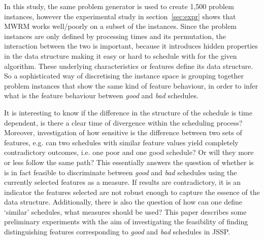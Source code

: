 \documentclass[10pt]{llncs} %
\newcommand{\good}{\emph{good} }
\newcommand{\bad}{\emph{bad} }
\begin{document}
In this study, the same problem generator is used to create 1,500 problem instances, however the experimental study in section~\ref{sec:expr} shows that MWRM works well/poorly on a subset of the instances. Since the problem instances are only defined by processing times and its permutation, the interaction between the two is important, because it introduces hidden properties in the data structure making it easy or hard to schedule with for the given algorithm. These underlying characteristics or features define its data structure. So a sophisticated way of discretising the instance space is grouping together problem instances that show the same kind of feature behaviour, in order to infer what is the feature behaviour between \good and \bad schedules. 

It is interesting to know if the difference in the structure of the schedule is time dependent, is there a clear time of divergence within the scheduling process? Moreover, investigation of how sensitive is the difference between two sets of features, e.g. can two schedules with similar feature values yield completely contradictory outcomes, i.e. one poor and one good schedule? Or will they more or less follow the same path? This essentially answers the question of whether is is in fact feasible to discriminate between \good and \bad schedules using the currently selected features as a measure. If results are contradictory, it is an indicator the features selected are not robust enough to capture the essence of the data structure. 
Additionally, there is also the question of how can one define `similar' schedules, what measures should be used? This paper describes some preliminary experiments with the aim of investigating the feasibility of finding distinguishing features corresponding to \good and \bad schedules in JSSP.
\end{document}
